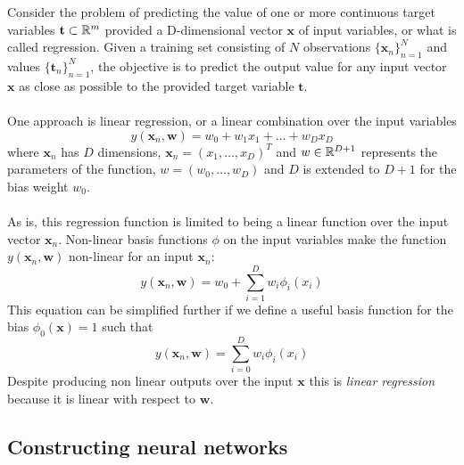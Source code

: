 Consider the problem of predicting the value of one or more continuous target variables 
$\mathbf{t} \subset \mathbb R^m$ provided a D-dimensional vector $\mathbf{x}$ of input variables, or 
what is called regression. Given a training set consisting of $N$ observations 
$\{\mathbf{x}_n\}_{n=1}^N$ and values $\{\mathbf{t}_n\}_{n=1}^N$, the objective is to predict 
the output value for any input vector $\mathbf{x}$ as close as possible to the provided target 
variable $\mathbf{t}$. 
\\\\
One approach is linear regression, or a linear combination over the input variables 
\begin{equation} 
    y(\mathbf{x}_n,\mathbf{w}) = w_0 + w_1x_1 + \ldots + w_Dx_D
\end{equation}
where $\mathbf{x}_n$ has $D$ dimensions, $\mathbf{x}_n = (x_1, \ldots, x_D)^T$ and $w \in \mathbb R^{D+1}$ 
represents the parameters of the function, $w = (w_0, \ldots, w_D)$ and $D$ is extended to $D+1$ 
for the bias weight $w_0$. 
\\\\
As is, this regression function is limited to being a linear function over the input vector 
$\mathbf{x}_n$. Non-linear basis functions $\phi$ on the input variables make the function 
$y\left(\mathbf{x}_n, \mathbf{w}\right)$ non-linear for an input $\mathbf{x}_n$:
\begin{equation} 
    y(\mathbf{x}_n,\mathbf{w}) = w_0 + \sum_{i=1}^{D} w_i \phi_i\left(x_i\right)
\end{equation}
This equation can be simplified further if we define a useful basis function for the bias
$\phi_0 (\mathbf{x}) =1$ such that
\begin{equation} 
    y(\mathbf{x}_n,\mathbf{w}) = \sum_{i=0}^{D} w_i \phi_i\left(x_i\right)
\end{equation}
Despite producing non linear outputs over the input $\mathbf{x}$ this is \textit{linear
regression} because it is linear with respect to $\mathbf{w}$.

\subsection{Constructing neural networks}

